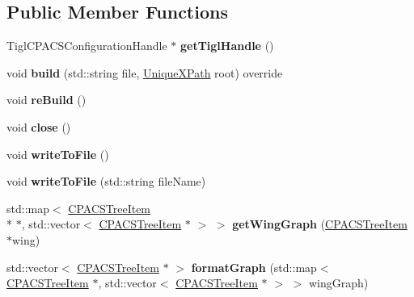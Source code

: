 \subsection*{Public Member Functions}
\begin{DoxyCompactItemize}
\item 
\hypertarget{classcpcr_1_1AircraftTree_ae744a2c510b2c41253a655b5b0dad2c7}{Tigl\-C\-P\-A\-C\-S\-Configuration\-Handle $\ast$ {\bfseries get\-Tigl\-Handle} ()}\label{classcpcr_1_1AircraftTree_ae744a2c510b2c41253a655b5b0dad2c7}

\item 
\hypertarget{classcpcr_1_1AircraftTree_ae014423054ed3f461d0a9f7dbc82d33b}{void {\bfseries build} (std\-::string file, \hyperlink{classcpcr_1_1UniqueXPath}{Unique\-X\-Path} root) override}\label{classcpcr_1_1AircraftTree_ae014423054ed3f461d0a9f7dbc82d33b}

\item 
\hypertarget{classcpcr_1_1AircraftTree_aee89f36aa0c2747c73610621c5ec7979}{void {\bfseries re\-Build} ()}\label{classcpcr_1_1AircraftTree_aee89f36aa0c2747c73610621c5ec7979}

\item 
\hypertarget{classcpcr_1_1AircraftTree_aa98b4e08584ca8b3afb96b1fb236a7dc}{void {\bfseries close} ()}\label{classcpcr_1_1AircraftTree_aa98b4e08584ca8b3afb96b1fb236a7dc}

\item 
\hypertarget{classcpcr_1_1AircraftTree_a076b3beaeb107a095ce2b6658620685e}{void {\bfseries write\-To\-File} ()}\label{classcpcr_1_1AircraftTree_a076b3beaeb107a095ce2b6658620685e}

\item 
\hypertarget{classcpcr_1_1AircraftTree_a0fbe75a07bbdfddcfb2bcd57fc9e4386}{void {\bfseries write\-To\-File} (std\-::string file\-Name)}\label{classcpcr_1_1AircraftTree_a0fbe75a07bbdfddcfb2bcd57fc9e4386}

\item 
\hypertarget{classcpcr_1_1AircraftTree_a5b84457be75ccd0296ca21fc19beddd3}{std\-::map$<$ \hyperlink{classcpcr_1_1CPACSTreeItem}{C\-P\-A\-C\-S\-Tree\-Item} \\*
$\ast$, std\-::vector$<$ \hyperlink{classcpcr_1_1CPACSTreeItem}{C\-P\-A\-C\-S\-Tree\-Item} $\ast$ $>$ $>$ {\bfseries get\-Wing\-Graph} (\hyperlink{classcpcr_1_1CPACSTreeItem}{C\-P\-A\-C\-S\-Tree\-Item} $\ast$wing)}\label{classcpcr_1_1AircraftTree_a5b84457be75ccd0296ca21fc19beddd3}

\item 
\hypertarget{classcpcr_1_1AircraftTree_ad663f9abc22df6d674e42fed3cd123d4}{std\-::vector$<$ \hyperlink{classcpcr_1_1CPACSTreeItem}{C\-P\-A\-C\-S\-Tree\-Item} $\ast$ $>$ {\bfseries format\-Graph} (std\-::map$<$ \hyperlink{classcpcr_1_1CPACSTreeItem}{C\-P\-A\-C\-S\-Tree\-Item} $\ast$, std\-::vector$<$ \hyperlink{classcpcr_1_1CPACSTreeItem}{C\-P\-A\-C\-S\-Tree\-Item} $\ast$ $>$ $>$ wing\-Graph)}\label{classcpcr_1_1AircraftTree_ad663f9abc22df6d674e42fed3cd123d4}


\end{DoxyCompactItemize}
